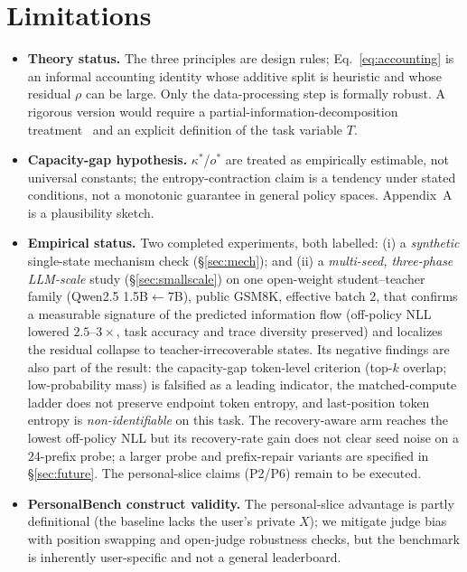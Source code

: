 \documentclass[11pt]{article}
\begin{document}
\section{Limitations}
\begin{itemize}
  \item \textbf{Theory status.} The three principles are design rules; Eq.~\eqref{eq:accounting} is an informal accounting identity whose additive split is heuristic and whose residual $\rho$ can be large. Only the data-processing step is formally robust. A rigorous version would require a partial-information-decomposition treatment~\cite{dissanayake2024pid} and an explicit definition of the task variable $T$.
  \item \textbf{Capacity-gap hypothesis.} $\kappa^\ast$/$o^\ast$ are treated as empirically estimable, not universal constants; the entropy-contraction claim is a tendency under stated conditions, not a monotonic guarantee in general policy spaces. Appendix~A is a plausibility sketch.
  \item \textbf{Empirical status.} Two completed experiments, both labelled: (i) a \emph{synthetic} single-state mechanism check (\S\ref{sec:mech}); and (ii) a \emph{multi-seed, three-phase LLM-scale} study (\S\ref{sec:smallscale}) on one open-weight student--teacher family (Qwen2.5 1.5B$\leftarrow$7B), public GSM8K, effective batch 2, that confirms a measurable signature of the predicted information flow (off-policy NLL lowered $2.5$--$3\times$, task accuracy and trace diversity preserved) and localizes the residual collapse to teacher-irrecoverable states. Its negative findings are also part of the result: the capacity-gap token-level criterion (top-$k$ overlap; low-probability mass) is falsified as a leading indicator, the matched-compute ladder does not preserve endpoint token entropy, and last-position token entropy is \emph{non-identifiable} on this task. The recovery-aware arm reaches the lowest off-policy NLL but its recovery-rate gain does not clear seed noise on a 24-prefix probe; a larger probe and prefix-repair variants are specified in \S\ref{sec:future}. The personal-slice claims (P2/P6) remain to be executed.
  \item \textbf{PersonalBench construct validity.} The personal-slice advantage is partly definitional (the baseline lacks the user's private $X$); we mitigate judge bias with position swapping and open-judge robustness checks, but the benchmark is inherently user-specific and not a general leaderboard.

\end{itemize}
\end{document}

